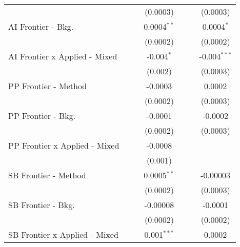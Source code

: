 \begin{tabular}{lcccccc}
                                 &               &               & (0.0003)       &                &                & (0.0003)\\   
   AI Frontier - Bkg.            &               &               & 0.0004$^{**}$  &                &                & 0.0004$^{*}$\\   
                                 &               &               & (0.0002)       &                &                & (0.0002)\\   
   AI Frontier x Applied - Mixed &               &               & -0.004$^{*}$   &                &                & -0.004$^{***}$\\   
                                 &               &               & (0.002)        &                &                & (0.0003)\\   
   PP Frontier - Method          &               &               & -0.0003        &                &                & 0.0002\\   
                                 &               &               & (0.0002)       &                &                & (0.0003)\\   
   PP Frontier - Bkg.            &               &               & -0.0001        &                &                & -0.0002\\   
                                 &               &               & (0.0002)       &                &                & (0.0003)\\   
   PP Frontier x Applied - Mixed &               &               & -0.0008        &                &                &   \\   
                                 &               &               & (0.001)        &                &                &   \\   
   SB Frontier - Method          &               &               & 0.0005$^{**}$  &                &                & -0.00003\\   
                                 &               &               & (0.0002)       &                &                & (0.0003)\\   
   SB Frontier - Bkg.            &               &               & -0.00008       &                &                & -0.0001\\   
                                 &               &               & (0.0002)       &                &                & (0.0002)\\   
   SB Frontier x Applied - Mixed &               &               & 0.001$^{***}$  &                &                & 0.0002\\   

\end{tabular}
